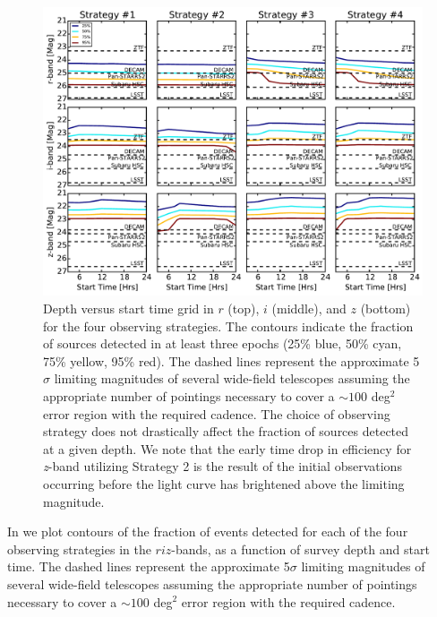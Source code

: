 \begin{figure}[t!]
\centering
\includegraphics[width=\textwidth]{./figs/chapter2/ch2_f4.pdf}
\caption{Depth versus start time grid in $r$ (top), $i$ (middle), and $z$ (bottom) for the four observing strategies. The contours indicate the fraction of sources detected in at least three epochs (25\% blue, 50\% cyan, 75\% yellow, 95\% red). The dashed lines represent the approximate 5$\sigma$ limiting magnitudes of several wide-field telescopes assuming the appropriate number of pointings necessary to cover a $\sim 100$ deg$^2$ error region with the required cadence. The choice of observing strategy does not drastically affect the fraction of sources detected at a given depth. We note that the early time drop in efficiency for {\em z}-band utilizing Strategy 2 is the result of the initial observations occurring before the light curve has brightened above the limiting magnitude.}
\label{fig:ch2_det}
\end{figure}

In  we plot contours of the fraction of events detected for each of the four observing strategies in the $riz$-bands, as a function of survey depth and start time. The dashed lines represent the approximate 5$\sigma$ limiting magnitudes of several wide-field telescopes assuming the appropriate number of pointings necessary to cover a $\sim 100$ deg$^2$ error region with the required cadence.

